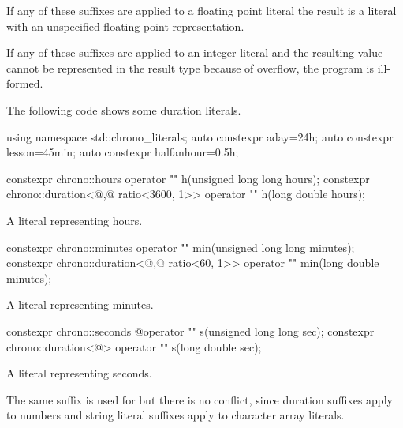 \pnum
If any of these suffixes are applied to a floating point literal the result is a
 literal with an unspecified floating point representation.

\pnum
If any of these suffixes are applied to an integer literal and the resulting
 value cannot be represented in the result type because
of overflow, the program is ill-formed.

\pnum
\begin{example}
The following code shows some duration literals.
\begin{codeblock}
using namespace std::chrono_literals;
auto constexpr aday=24h;
auto constexpr lesson=45min;
auto constexpr halfanhour=0.5h;
\end{codeblock}
\end{example}

%
\begin{itemdecl}
constexpr chrono::hours                                 operator "" h(unsigned long long hours);
constexpr chrono::duration<@\unspec,@ ratio<3600, 1>> operator "" h(long double hours);
\end{itemdecl}

\begin{itemdescr}
\pnum
\returns
A  literal representing  hours.
\end{itemdescr}

%
\begin{itemdecl}
constexpr chrono::minutes                             operator "" min(unsigned long long minutes);
constexpr chrono::duration<@\unspec,@ ratio<60, 1>> operator "" min(long double minutes);
\end{itemdecl}

\begin{itemdescr}
\pnum
\returns
A  literal representing  minutes.
\end{itemdescr}

%
\begin{itemdecl}
constexpr chrono::seconds  @\itcorr@             operator "" s(unsigned long long sec);
constexpr chrono::duration<@\unspec@> operator "" s(long double sec);
\end{itemdecl}

\begin{itemdescr}
\pnum
\returns
A  literal representing  seconds.

\pnum
\begin{note}
The same suffix  is used for  but there is no
conflict, since duration suffixes apply to numbers and string literal suffixes
apply to character array literals.
\end{note}
\end{itemdescr}

